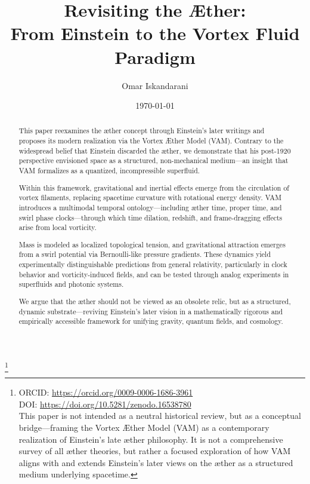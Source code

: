 \documentclass[preprint,titlepage]{revtex4-2}
\begin{document}
    \title{Revisiting the Æther:\\ From Einstein to the Vortex Fluid Paradigm}

    \author{Omar Iskandarani}
    \thanks{
        ORCID: \url{https://orcid.org/0009-0006-1686-3961}\\
        DOI: \url{https://doi.org/10.5281/zenodo.16538780}\\
        \footnotesize{This paper is not intended as a neutral historical review, but as a conceptual bridge—framing the Vortex Æther Model (VAM) as a contemporary realization of Einstein’s late æther philosophy.
        It is not a comprehensive survey of all æther theories, but rather a focused exploration of how VAM aligns with and extends Einstein’s later views on the æther as a structured medium underlying spacetime.}
    }

    \date{\today}


    \vspace{1em}

    \begin{abstract}
        This paper reexamines the æther concept through Einstein’s later writings and proposes its modern realization via the Vortex Æther Model (VAM). Contrary to the widespread belief that Einstein discarded the æther, we demonstrate that his post-1920 perspective envisioned space as a structured, non-mechanical medium—an insight that VAM formalizes as a quantized, incompressible superfluid.

        Within this framework, gravitational and inertial effects emerge from the circulation of vortex filaments, replacing spacetime curvature with rotational energy density. VAM introduces a multimodal temporal ontology—including æther time, proper time, and swirl phase clocks—through which time dilation, redshift, and frame-dragging effects arise from local vorticity.

        Mass is modeled as localized topological tension, and gravitational attraction emerges from a swirl potential via Bernoulli-like pressure gradients. These dynamics yield experimentally distinguishable predictions from general relativity, particularly in clock behavior and vorticity-induced fields, and can be tested through analog experiments in superfluids and photonic systems.

        We argue that the æther should not be viewed as an obsolete relic, but as a structured, dynamic substrate—reviving Einstein’s later vision in a mathematically rigorous and empirically accessible framework for unifying gravity, quantum fields, and cosmology.
    \end{abstract}
\end{document}
